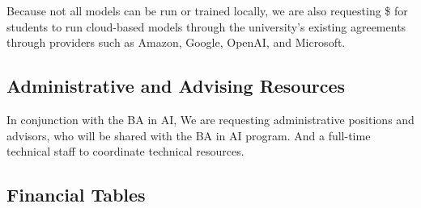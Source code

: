 Because not all models can be run or trained locally, we are also requesting \$\cloud{} for students to run cloud-based models through the university's existing agreements through providers such as Amazon, Google, OpenAI, and Microsoft.

\subsection{Administrative and Advising Resources}



In conjunction with the BA in AI, We are requesting \admin{} administrative positions and \advisors{} advisors, who will be shared with the BA in AI program.  And a full-time technical staff to coordinate technical resources.

\subsection{Financial Tables}